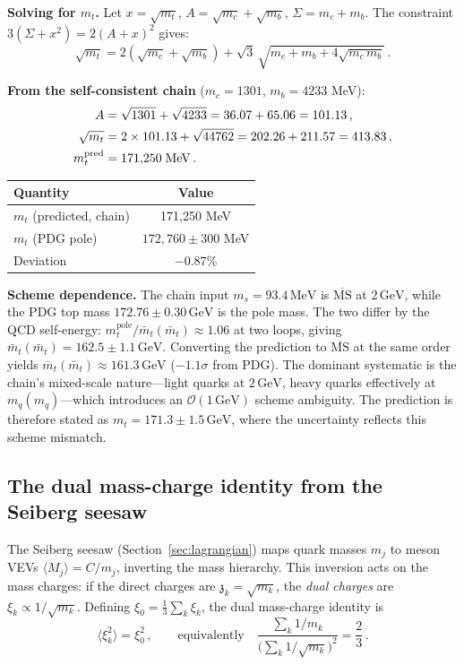 \documentclass[12pt,a4paper]{article}
\newcommand{\MeV}{\,\text{MeV}}
\newcommand{\GeV}{\,\text{GeV}}
\newcommand{\zch}{\mathfrak{z}}
\begin{document}
\textbf{Solving for $m_t$.} Let $x = \sqrt{m_t}$,
$A = \sqrt{m_c} + \sqrt{m_b}$, $\Sigma = m_c + m_b$. The constraint
$3(\Sigma + x^2) = 2(A + x)^2$ gives:
\begin{equation}
\sqrt{m_t}
= 2(\sqrt{m_c} + \sqrt{m_b})
+ \sqrt{3}\,\sqrt{m_c + m_b + 4\sqrt{m_c\,m_b}}\,.
\end{equation}

\textbf{From the self-consistent chain} ($m_c = 1301$, $m_b = 4233$ MeV):
\begin{align}
A &= \sqrt{1301} + \sqrt{4233} = 36.07 + 65.06 = 101.13\,, \notag\\
\sqrt{m_t} &= 2 \times 101.13 + \sqrt{44762} = 202.26 + 211.57 = 413.83\,, \notag\\
m_t^{\mathrm{pred}} &= 171{,}250\;\mathrm{MeV}\,.
\end{align}

\begin{center}
\begin{tabular}{lc}
\toprule
Quantity & Value \\
\midrule
$m_t$ (predicted, chain) & 171,250 MeV \\
$m_t$ (PDG pole) & $172{,}760 \pm 300$ MeV \\
Deviation & $-0.87\%$ \\
\bottomrule
\end{tabular}
\end{center}

\textbf{Scheme dependence.} The chain input $m_s = 93.4\MeV$
is $\overline{\mathrm{MS}}$ at $2\GeV$, while the PDG top mass
$172.76 \pm 0.30\GeV$ is the pole mass. The two differ by the
QCD self-energy: $m_t^{\text{pole}}/\bar m_t(\bar m_t) \approx 1.06$
at two loops, giving $\bar m_t(\bar m_t) = 162.5 \pm 1.1\GeV$.
Converting the prediction to $\overline{\mathrm{MS}}$ at the same
order yields $\bar m_t(\bar m_t) \approx 161.3\GeV$
($-1.1\sigma$ from PDG). The dominant systematic is
the chain's mixed-scale nature---light quarks at $2\GeV$,
heavy quarks effectively at $m_q(m_q)$---which introduces
an $\mathcal{O}(1\GeV)$ scheme ambiguity. The prediction is
therefore stated as $m_t = 171.3 \pm 1.5\GeV$, where the
uncertainty reflects this scheme mismatch.

\subsection{The dual mass-charge identity from the Seiberg seesaw}

The Seiberg seesaw (Section~\ref{sec:lagrangian}) maps quark masses
$m_j$ to meson VEVs $\langle M_j\rangle = C/m_j$, inverting the mass
hierarchy. This inversion acts on the mass charges: if the direct
charges are $\zch_k = \sqrt{m_k}$, the \emph{dual charges} are
$\xi_k \propto 1/\sqrt{m_k}$. Defining
$\xi_0 = \tfrac{1}{3}\sum_k\xi_k$, the dual mass-charge identity is
\begin{equation}
  \langle\xi_k^2\rangle = \xi_0^2\,,
  \qquad\text{equivalently}\quad
  \frac{\sum_k 1/m_k}{\bigl(\sum_k 1/\sqrt{m_k}\bigr)^2}
  = \frac{2}{3}\,.
\end{equation}
\end{document}
